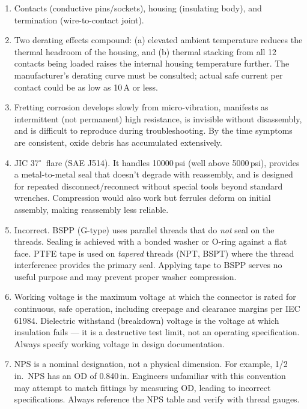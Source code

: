 \documentclass[11pt,letterpaper,twoside,openany]{book}
\begin{document}
\begin{enumerate}[leftmargin=1.5em]
  \item Contacts (conductive pins/sockets), housing (insulating body), and termination (wire-to-contact joint).

  \item Two derating effects compound: (a) elevated ambient temperature reduces the thermal headroom of the housing, and (b) thermal stacking from all 12 contacts being loaded raises the internal housing temperature further. The manufacturer's derating curve must be consulted; actual safe current per contact could be as low as 10\,A or less.

  \item Fretting corrosion develops slowly from micro-vibration, manifests as intermittent (not permanent) high resistance, is invisible without disassembly, and is difficult to reproduce during troubleshooting. By the time symptoms are consistent, oxide debris has accumulated extensively.

  \item JIC 37$^{\circ}$\ flare (SAE J514). It handles 10000\,psi (well above 5000\,psi), provides a metal-to-metal seal that doesn't degrade with reassembly, and is designed for repeated disconnect/reconnect without special tools beyond standard wrenches. Compression would also work but ferrules deform on initial assembly, making reassembly less reliable.

  \item Incorrect. BSPP (G-type) uses parallel threads that do \emph{not} seal on the threads. Sealing is achieved with a bonded washer or O-ring against a flat face. PTFE tape is used on \emph{tapered} threads (NPT, BSPT) where the thread interference provides the primary seal. Applying tape to BSPP serves no useful purpose and may prevent proper washer compression.

  \item Working voltage is the maximum voltage at which the connector is rated for continuous, safe operation, including creepage and clearance margins per IEC 61984. Dielectric withstand (breakdown) voltage is the voltage at which insulation fails --- it is a destructive test limit, not an operating specification. Always specify working voltage in design documentation.

  \item NPS is a nominal designation, not a physical dimension. For example, 1/2\,in.\ NPS has an OD of 0.840\,in. Engineers unfamiliar with this convention may attempt to match fittings by measuring OD, leading to incorrect specifications. Always reference the NPS table and verify with thread gauges.


\end{enumerate}
\end{document}
